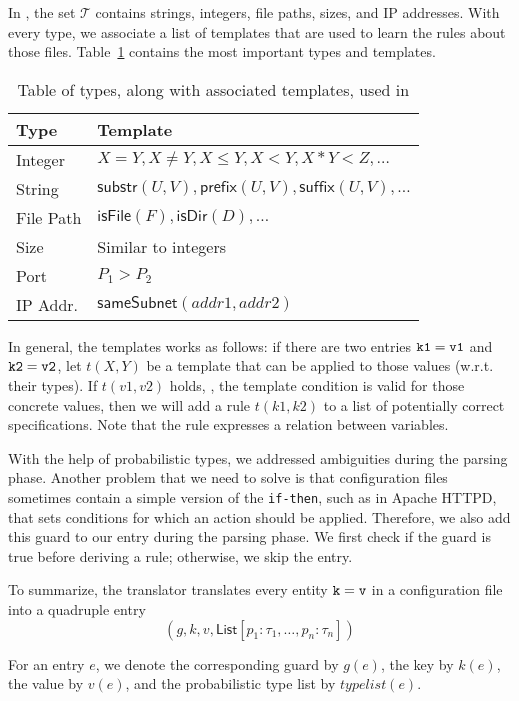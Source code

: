 In \app, the set $\mathcal{T}$ contains strings, integers, file paths, 
sizes, and IP addresses. With every type, we associate a list of templates 
that are used to learn the rules about those files. Table~\ref{table:kysymys} contains
the most important types and templates.

\begin{table}
\caption{Table of types, along with associated templates, used in \app}
  \begin{tabular}{| l |  l |}
    \hline
    Type &  Template \\ \hline
    \hline
    Integer & $X = Y, X\neq Y, X \leq Y, X < Y, X * Y < Z, \ldots $\\ \hline
    String & $\textsf{substr}(U, V), \textsf{prefix}(U,V), \textsf{suffix}(U,V), \ldots$   \\ \hline
    File Path & $\textsf{isFile}(F), \textsf{isDir}(D),\ldots$   \\ \hline
    Size & Similar to integers   \\ \hline
    Port & $P_1 > P_2$ \\ \hline
    IP Addr.  & $\textsf{sameSubnet}(addr1, addr2)$   \\
    
    \hline
  \end{tabular}
\label{table:kysymys}
\end{table}


In general, the templates works as follows: if there are two entries ${\tt {k1 = v1}}$ and 
${\tt {k2 = v2}}$, let $t(X, Y)$ be a template that can be applied to those values (w.r.t. their types).
If $t(v1, v2)$ holds, \ie, the template condition is valid for those concrete values, then we will add a rule
$t(k1, k2)$ to a list of potentially correct specifications. Note that the rule expresses a relation between variables.

With the help of probabilistic types, we addressed ambiguities during the parsing phase. Another problem that we need to solve
is that configuration files sometimes contain a simple version of the {\tt {if-then}}, such as in Apache HTTPD, that 
sets conditions for which an action should be applied. Therefore, we also add this guard to our entry 
during the parsing phase. We first check if the guard is true before deriving a rule; otherwise, we skip the entry.

To summarize, the translator translates every entity ${\tt {k = v}}$ in a configuration file into a quadruple entry
$$(g,k,v,\textsf{List}[p_1:\tau_1, \ldots, p_n:\tau_n])$$

For an entry $e$, we denote the corresponding guard by $g(e)$, the key by $k(e)$, the value by $v(e)$, and the probabilistic
type list by $typelist(e)$. 

